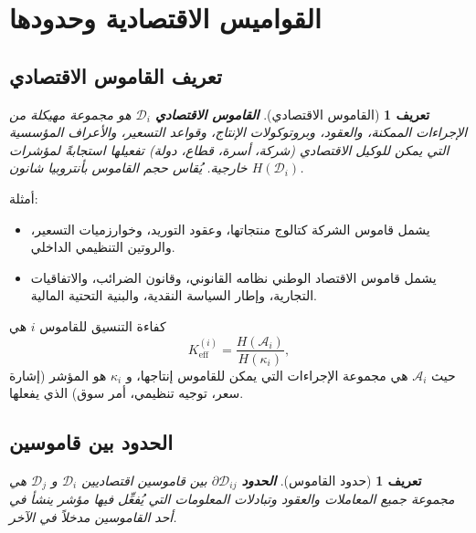 \documentclass[12pt,a4paper]{article}
\newtheorem{definition}[theorem]{تعريف}
\theoremstyle{remark}
\begin{document}
	\section{القواميس الاقتصادية وحدودها}
	
	\subsection{تعريف القاموس الاقتصادي}
	
	\begin{definition}[القاموس الاقتصادي]
		\textbf{القاموس الاقتصادي} \(\mathcal{D}_i\) هو مجموعة مهيكلة من الإجراءات الممكنة، والعقود، وبروتوكولات الإنتاج، وقواعد التسعير، والأعراف المؤسسية التي يمكن للوكيل الاقتصادي (شركة، أسرة، قطاع، دولة) تفعيلها استجابةً لمؤشرات خارجية. يُقاس حجم القاموس بأنتروبيا شانون \(H(\mathcal{D}_i)\).
	\end{definition}
	
	أمثلة:
	\begin{itemize}
		\item يشمل قاموس الشركة كتالوج منتجاتها، وعقود التوريد، وخوارزميات التسعير، والروتين التنظيمي الداخلي.
		\item يشمل قاموس الاقتصاد الوطني نظامه القانوني، وقانون الضرائب، والاتفاقيات التجارية، وإطار السياسة النقدية، والبنية التحتية المالية.
	\end{itemize}
	
	كفاءة التنسيق للقاموس \(i\) هي
	\begin{equation}
		K_{\mathrm{eff}}^{(i)} = \frac{H(\mathcal{A}_i)}{H(\kappa_i)},
		\label{eq:keff_econ}
	\end{equation}
	حيث \(\mathcal{A}_i\) هي مجموعة الإجراءات التي يمكن للقاموس إنتاجها، و \(\kappa_i\) هو المؤشر (إشارة سعر، توجيه تنظيمي، أمر سوق) الذي يفعلها.
	
	\subsection{الحدود بين قاموسين}
	
	\begin{definition}[حدود القاموس]
		\textbf{الحدود} \(\partial\mathcal{D}_{ij}\) بين قاموسين اقتصاديين \(\mathcal{D}_i\) و \(\mathcal{D}_j\) هي مجموعة جميع المعاملات والعقود وتبادلات المعلومات التي يُفعِّل فيها مؤشر ينشأ في أحد القاموسين مدخلاً في الآخر.
	\end{definition}
	
\end{document}
